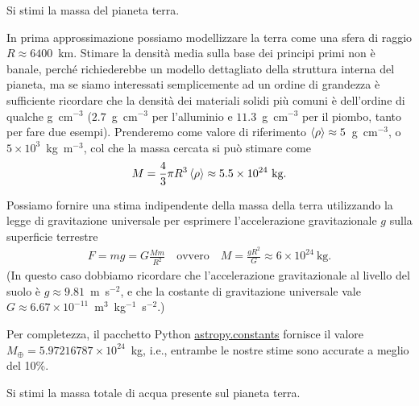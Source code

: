 \begin{exercise}

Si stimi la massa del pianeta terra.

\end{exercise}


\begin{solution}

In prima approssimazione possiamo modellizzare la terra come una sfera di raggio
$R \approx 6400$~km. Stimare la densit\`a media sulla base dei principi primi
non \`e banale, perch\'e richiederebbe un modello dettagliato della struttura
interna del pianeta, ma se siamo interessati semplicemente ad un ordine di grandezza
\`e sufficiente ricordare che la densit\`a dei materiali solidi pi\`u comuni
\`e dell'ordine di qualche g~cm$^{-3}$ ($2.7$~g~cm$^{-3}$ per l'alluminio e
$11.3$~g~cm$^{-3}$ per il piombo, tanto per fare due esempi).
Prenderemo come valore di riferimento $\displaystyle \left<\rho\right> \approx 5$~g~cm$^{-3}$,
o $5 \times 10^3$~kg~m$^{-3}$, col che la massa cercata si pu\`o stimare come
\begin{align}
  M = \frac{4}{3} \pi R^3 \displaystyle \left<\rho\right> \approx 5.5 \times 10^{24}~\text{kg}.
\end{align}

Possiamo fornire una stima indipendente della massa della terra utilizzando la
legge di gravitazione universale per esprimere l'accelerazione gravitazionale
$g$ sulla superficie terrestre
\begin{align}
  F = mg = G \frac{M m}{R^2}
  \quad \text{ovvero} \quad
  {M} = \frac{g R^2}{G} \approx 6 \times 10^{24}~\text{kg}.
\end{align}
(In questo caso dobbiamo ricordare che l'accelerazione gravitazionale al livello
del suolo \`e $g \approx 9.81$~m~s$^{-2}$, e che la costante di gravitazione
universale vale $G \approx 6.67 \times 10^{-11}$~m$^3$~kg$^{-1}$~s$^{-2}$.)

Per completezza, il pacchetto Python
\href{https://docs.astropy.org/en/latest/constants/index.html}{astropy.constants}
fornisce il valore $M_\oplus = 5.97216787 \times 10^{24}$~kg, i.e., entrambe
le nostre stime sono accurate a meglio del 10\%.



\end{solution}


\begin{exercise}

Si stimi la massa totale di acqua presente sul pianeta terra.

\end{exercise}


